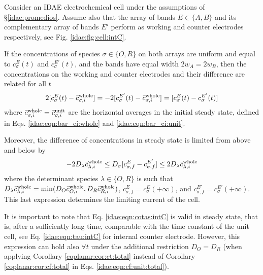 \begin{teorema}
	\label{idae:teo:cE-cE':intC}
	Consider an IDAE electrochemical cell under the assumptions of \S\ref{idae:promedios}.
	Assume also that the array of bands $E \in \{A,B\}$ and its complementary array of bands $E'$
	perform as working and counter electrodes respectively,
	see Fig. \ref{idae:fig:cell:intC}.

	If the concentrations of species $\sigma \in \{O,R\}$ on both
	arrays are uniform and equal to $c_{\sigma}^{E}(t)$ and $c_{\sigma}^{E'}(t)$,
	and the bands have equal width $2w_{A} = 2w_{B}$, 
	then the concentrations on the working and counter electrodes
	and their difference are related for all $t$
	\begin{equation}
		\label{idae:eqn:cE':intC}
		2[c_{\sigma}^{E}(t) - \bar{c}_{\sigma,i}^{\text{whole}}]
		= -2[c_{\sigma}^{E'}(t) - \bar{c}_{\sigma,i}^{\text{whole}}]
		= [c_{\sigma}^{E}(t) - c_{\sigma}^{E'}(t)]
	\end{equation}
	where $\bar{c}_{\sigma,i}^{\text{whole}}=\bar{c}_{\sigma,i}^{\text{unit}}$
	are the horizontal averages in the initial steady state,
	defined in Eqs. \eqref{idae:eqn:bar_ci:whole} and \eqref{idae:eqn:bar_ci:unit}.
	
	Moreover, the difference of concentrations in steady state
	is limited from above and below by
	\begin{equation}
		\label{idae:eqn:cotas:intC}
		-2 D_{\lambda} \bar{c}_{\lambda,i}^{\text{whole}}
		\leq D_{\sigma} [c_{\sigma,f}^{E} - c_{\sigma,f}^{E'}]
		\leq 2 D_{\lambda} \bar{c}_{\lambda,i}^{\text{whole}}
	\end{equation}
	where the determinant species $\lambda \in \{O,R\}$ is such that
	$D_{\lambda} \bar{c}_{\lambda,i}^{\text{whole}} = \min(D_{O} \bar{c}_{O,i}^{\text{whole}}, D_{R} \bar{c}_{R,i}^{\text{whole}})$,
	$c_{\sigma,f}^{E} = c_{\sigma}^{E}(+\infty)$,
	and $c_{\sigma,f}^{E'} = c_{\sigma}^{E'}(+\infty)$.
	This last expression determines the limiting current of the cell.
\end{teorema}

It is important to note that Eq. \eqref{idae:eqn:cotas:intC}
is valid in steady state, that is, after a sufficiently long time,
comparable with the time constant of the unit cell,
see Eq. \eqref{idae:eqn:tau:intC} for internal counter electrode.
However, this expression can hold also $\forall t$
under the additional restriction $D_{O} = D_{R}$
(when applying Corollary \ref{coplanar:cor:ct:total}
instead of Corollary \ref{coplanar:cor:cf:total}
in Eqs. \eqref{idae:eqn:cf:unit:total}).

